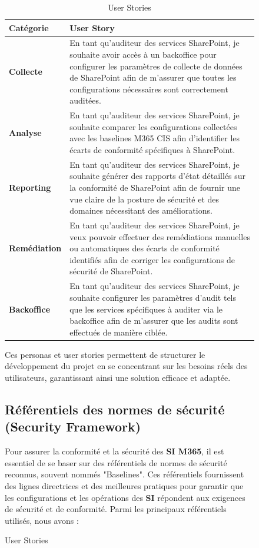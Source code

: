 \begin{figure}[H]
\begin{table}[h!]
\begin{center}
\begin{tabular}{| m{} | m{} |}
\hline
\textbf{Catégorie} & \textbf{User Story} \\
\hline
\textbf{Collecte} & En tant qu'auditeur des services SharePoint, je souhaite avoir accès à un backoffice pour configurer les paramètres de collecte de données de SharePoint afin de m'assurer que toutes les configurations nécessaires sont correctement auditées. \\
\hline
\textbf{Analyse} & En tant qu'auditeur des services SharePoint, je souhaite comparer les configurations collectées avec les baselines M365 CIS afin d'identifier les écarts de conformité spécifiques à SharePoint. \\
\hline
\textbf{Reporting} & En tant qu'auditeur des services SharePoint, je souhaite générer des rapports d'état détaillés sur la conformité de SharePoint afin de fournir une vue claire de la posture de sécurité et des domaines nécessitant des améliorations. \\
\hline
\textbf{Remédiation} & En tant qu'auditeur des services SharePoint, je veux pouvoir effectuer des remédiations manuelles ou automatiques des écarts de conformité identifiés afin de corriger les configurations de sécurité de SharePoint. \\
\hline
\textbf{Backoffice} & En tant qu'auditeur des services SharePoint, je souhaite configurer les paramètres d'audit tels que les services spécifiques à auditer via le backoffice afin de m'assurer que les audits sont effectués de manière ciblée. \\
\hline
\end{tabular}
\caption{User Stories}
\end{center}
\end{table}

Ces personas et user stories permettent de structurer le développement du projet en se concentrant sur les besoins réels des utilisateurs, garantissant ainsi une solution efficace et adaptée.

\subsection{Référentiels des normes de sécurité (Security Framework)}

Pour assurer la conformité et la sécurité des \textbf{SI M365}, il est essentiel de se baser sur des référentiels de normes de sécurité reconnus, souvent nommés "Baselines". Ces référentiels fournissent des lignes directrices et des meilleures pratiques pour garantir que les configurations et les opérations des \textbf{SI} répondent aux exigences de sécurité et de conformité. Parmi les principaux référentiels utilisés, nous avons :


\end{figure}
